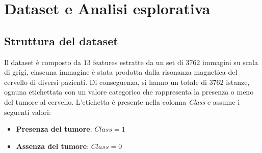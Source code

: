 \chapter{Dataset e Analisi esplorativa} \label{cap:dataset}
\section{Struttura del dataset}
Il dataset è composto da $13$ features estratte da un set di $3762$ immagini su
scala di grigi, ciascuna immagine è stata prodotta dalla risonanza magnetica del
cervello di diversi pazienti. Di conseguenza, si hanno un totale di $3762$
istanze, ognuna etichettata con un valore categorico che rappresenta la presenza
o meno del tumore al cervello. L'etichetta è presente nella colonna \textit{Class}
e assume i seguenti valori:
\begin{itemize}
      \item \textbf{Presenza del tumore}: $Class = 1$
      \item \textbf{Assenza del tumore}: $Class = 0$
\end{itemize}

